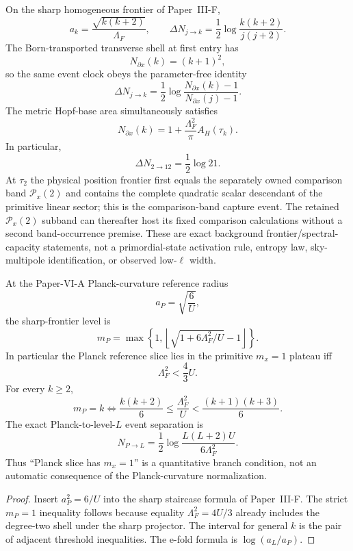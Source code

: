 \documentclass[12pt,a4paper]{article}
\begin{document}
\begin{proposition}
\label{p8:prop:v191-background-frontier-clock}
On the sharp homogeneous frontier of Paper~III-F,
\[
 a_k=\frac{\sqrt{k(k+2)}}{\Lambda_F},
 \qquad
 \Delta N_{j\to k}=\frac12\log\frac{k(k+2)}{j(j+2)}.
\]
The Born-transported transverse shell at first entry has
\[
 N_{\partial x}(k)=(k+1)^2,
\]
so the same event clock obeys the parameter-free identity
\[
 \boxed{
 \Delta N_{j\to k}
 =\frac12\log
 \frac{N_{\partial x}(k)-1}{N_{\partial x}(j)-1}.}
\]
The metric Hopf-base area simultaneously satisfies
\[
 \boxed{
 N_{\partial x}(k)
 =1+\frac{\Lambda_F^2}{\pi}A_H(\tau_k).}
\]
In particular,
\[
 \Delta N_{2\to12}=\frac12\log21.
\]
At $\tau_2$ the physical position frontier first equals the separately owned
comparison band $\mathcal P_x(2)$ and contains the complete quadratic scalar
descendant of the primitive linear sector; this is the comparison-band
capture event.  The retained $\mathcal P_x(2)$ subband can thereafter host
its fixed comparison calculations without a second band-occurrence premise.
These are exact background frontier/spectral-capacity statements, not a
primordial-state activation rule, entropy law, sky-multipole identification,
or observed low-$\ell$ width.
\end{proposition}

\begin{proposition}
\label{p8:prop:v260-planck-frontier-phase-diagram}
At the Paper-VI-A Planck-curvature reference radius
\[
 a_P=\sqrt{\frac6{U}},
\]
the sharp-frontier level is
\[
 \boxed{
 m_P
 =\max\left\{1,
 \left\lfloor\sqrt{1+6\Lambda_F^2/U}-1\right\rfloor
 \right\}.}
\]
In particular the Planck reference slice lies in the primitive $m_x=1$
plateau iff
\[
 \boxed{\Lambda_F^2<\frac43U.}
\]
For every $k\ge2$,
\[
 \boxed{
 m_P=k
 \iff
 \frac{k(k+2)}6\le\frac{\Lambda_F^2}{U}
 <\frac{(k+1)(k+3)}6.}
\]
The exact Planck-to-level-$L$ event separation is
\[
 \boxed{
 N_{P\to L}
 =\frac12\log\frac{L(L+2)U}{6\Lambda_F^2}.}
\]
Thus ``Planck slice has $m_x=1$'' is a quantitative branch condition, not an
automatic consequence of the Planck-curvature normalization.
\end{proposition}

\begin{proof}
Insert $a_P^2=6/U$ into the sharp staircase formula of Paper~III-F.
The strict $m_P=1$ inequality follows because equality
$\Lambda_F^2=4U/3$ already includes the degree-two shell under the sharp
projector.  The interval for general $k$ is the pair of adjacent threshold
inequalities.  The e-fold formula is $\log(a_L/a_P)$.
\end{proof}
\end{document}
